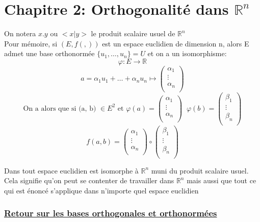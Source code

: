 \documentclass{article}
\author{Frederic Becerril}
\begin{document}
\part*{Chapitre 2: Orthogonalité dans $\mathbb{R}^n$}

On notera $x . y$ ou $<x | y>$ le produit scalaire usuel de $\mathbb{R}^n$ \\
Pour mémoire, si $(E, f(,))$ est un espace euclidien de dimension n, alors E admet une base orthonormée $\{u_1, \dots, u_n\} = U$ et on a un isomorphisme:
$$\varphi : E \rightarrow \mathbb{R}$$
$$a = \alpha_1 u_1 + \dots + \alpha_n u_n \longmapsto
\left(
    \begin{array}{ll}
        \alpha_1 \\
        \vdots \\
        \alpha_n \\
    \end{array}
\right)
$$
$$\mbox{On a alors que si (a, b) } \in E^2 \mbox{ et } \varphi(a) =
\begin{pmatrix}
    \alpha_1 \\
    \vdots \\
    \alpha_n \\
\end{pmatrix}
\;\;\varphi(b) =
\begin{pmatrix}
    \beta_1 \\
    \vdots \\
    \beta_n \\
\end{pmatrix}
$$
$$f(a, b) = 
\begin{pmatrix}
    \alpha_1 \\
    \vdots \\
    \alpha_n \\
\end{pmatrix}
\circ
\begin{pmatrix}
    \beta_1 \\
    \vdots \\
    \beta_n \\
\end{pmatrix}
$$

Dans tout espace euclidien est isomorphe à $\mathbb{R}^n$ muni du produit scalaire usuel. \\
Cela signifie qu'on peut se contenter de travailler dans $\mathbb{R}^n$ mais aussi que tout 
ce qui est énoncé s'applique dans n'importe quel espace euclidien

\section{\underline{Retour sur les bases orthogonales et orthonormées}}
\end{document}
